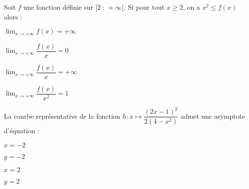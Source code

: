 \begin{QCM}
  \begin{GroupeQCM}
    \begin{exercice}
      Soit $f$ une fonction définie sur $[2~;~+\infty[$. Si pour tout $x\geqslant 2$, on a $x^2 \leqslant f(x)$ alors :
      \begin{ChoixQCM}{4}
      \item $\displaystyle\lim_{x\to +\infty} f(x)=+\infty$
      \item $\displaystyle\lim_{x\to +\infty} \dfrac{f(x)}{x}=0$
      \item $\displaystyle\lim_{x\to +\infty} \dfrac{f(x)}{x}=+\infty$
      \item $\displaystyle\lim_{x\to +\infty} \dfrac{f(x)}{x^2}=1$
      \end{ChoixQCM}
      \begin{corrige}
   \end{corrige}
    \end{exercice}


    \begin{exercice}
      La courbe représentative de la fonction
      $h:x\mapsto \dfrac{\left(2x - 1\right)^2}{2(4-x^2)}$ admet une asymptote d'équation :
      \begin{ChoixQCM}{4}
      \item $x = -2$
      \item $y = -2$
      \item $x = 2$
      \item $y = 2$
      \end{ChoixQCM}
      \begin{corrige}
   \end{corrige}
    \end{exercice}


\end{GroupeQCM}
\end{QCM}
